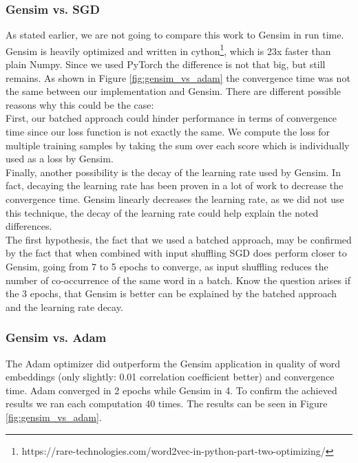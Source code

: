 \subsubsection{Gensim vs. SGD}
As stated earlier, we are not going to compare this work to Gensim in run time. Gensim is heavily optimized and written in cython\footnote{https://rare-technologies.com/word2vec-in-python-part-two-optimizing/}, which is 23x faster than plain Numpy. Since we used PyTorch the difference is not that big, but still remains. As shown in Figure \ref{fig:gensim_vs_adam} the convergence time was not the same between our implementation and Gensim. There are different possible reasons why this could be the case:\\ First, our batched approach could hinder performance in terms of convergence time since our loss function is not exactly the same. We compute the loss for multiple training samples by taking the sum over each score which is individually used as a loss by Gensim.\\ Finally, another possibility is the decay of the learning rate used by Gensim. In fact, decaying the learning rate has been proven in a lot of work to decrease the convergence time. Gensim linearly decreases the learning rate, as we did not use this technique, the decay of the learning rate could help explain the noted differences. \\ The first hypothesis, the fact that we used a batched approach, may be confirmed by the fact that when combined with input shuffling SGD does perform closer to Gensim, going from 7 to 5 epochs to converge, as input shuffling reduces the number of co-occurrence of the same word in a batch.
Know the question arises if the 3 epochs, that Gensim is better can be explained by the batched approach and the learning rate decay.

\subsubsection{Gensim vs. Adam}
The Adam optimizer did outperform the Gensim application in quality of word embeddings (only slightly: 0.01 correlation coefficient better) and convergence time. Adam converged in 2 epochs while Gensim in 4. To confirm the achieved results we ran each computation 40 times. The results can be seen in Figure \ref{fig:gensim_vs_adam}.

